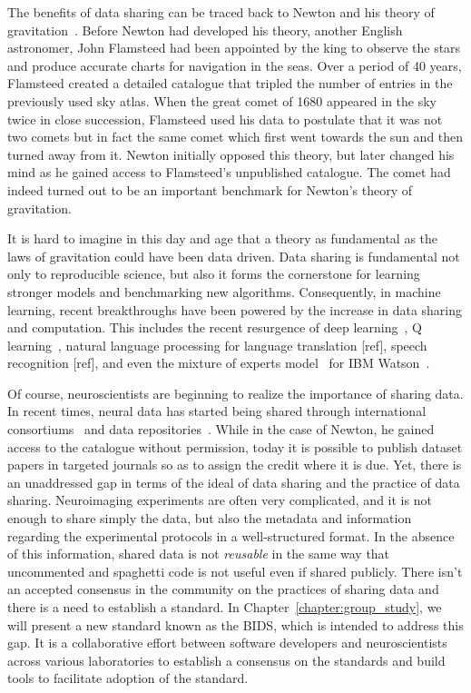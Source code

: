 The benefits of data sharing can be traced back to Newton and his theory of gravitation~\citep{pointofview2013}. Before Newton had developed his theory, another English astronomer, John Flamsteed had been appointed by the king to observe the stars and produce accurate charts for navigation in the seas. Over a period of 40 years, Flamsteed created a detailed catalogue that tripled the number of entries in the previously used sky atlas. When the great comet of 1680 appeared in the sky twice in close succession, Flamsteed used his data to postulate that it was not two comets but in fact the same comet which first went towards the sun and then turned away from it. Newton initially opposed this theory, but later changed his mind as he gained access to Flamsteed's unpublished catalogue. The comet had indeed turned out to be an important benchmark for Newton's theory of gravitation.

It is hard to imagine in this day and age that a theory as fundamental as the laws of gravitation could have been data driven. Data sharing is fundamental not only to reproducible science, but also it forms the cornerstone for learning stronger models and benchmarking new algorithms. Consequently, in machine learning, recent breakthroughs have been powered by the increase in data sharing and computation. This includes the recent resurgence of deep learning~\citep{deng2009imagenet}, Q learning~\citep{watkins1992q, bellemare2013arcade}, natural language processing for language translation [ref], speech recognition [ref], and even the mixture of experts model~\citep{jacobs1991adaptive} for IBM Watson~\citep{ferrucci2010building}. 

Of course, neuroscientists are beginning to realize the importance of sharing data. In recent times, neural data has started being shared through international consortiums~\citep{van2013wu, ollier2005uk} and data repositories~\citep{poldrack2013toward, gorgolewski2015neurovault}. While in the case of Newton, he gained access to the catalogue without permission, today it is possible to publish dataset papers in targeted journals so as to assign the credit where it is due. Yet, there is an unaddressed gap in terms of the ideal of data sharing and the practice of data sharing. Neuroimaging experiments are often very complicated, and it is not enough to share simply the data, but also the metadata and information regarding the experimental protocols in a well-structured format. In the absence of this information, shared data is not \emph{reusable} in the same way that uncommented and spaghetti code is not useful even if shared publicly. There isn't an accepted consensus in the community on the practices of sharing data and there is a need to establish a standard. In Chapter~\ref{chapter:group_study}, we will present a new standard known as the \ac{BIDS}, which is intended to address this gap. It is a collaborative effort between software developers and neuroscientists across various laboratories to establish a consensus on the standards and build tools to facilitate adoption of the standard.

